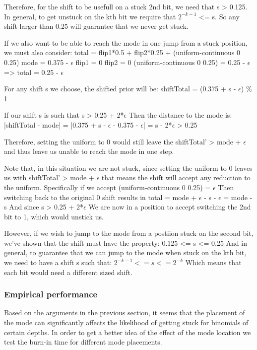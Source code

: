 Therefore, for the shift to be usefull on a stuck 2nd bit, we need that s > 0.125. In general, to get unstuck on the kth bit we require that $2^{-k-1}$ <= s. So any shift larger than 0.25 will guarantee that we never get stuck.

If we also want to be able to reach the mode in one jump from a stuck position, we must also consider:
total = flip1*0.5 + flip2*0.25 + (uniform-continuous 0 0.25)
mode = 0.375 - $\epsilon$
flip1 = 0
flip2 = 0
(uniform-continuous 0 0.25) = 0.25 - $\epsilon$ 
=> total = 0.25 - $\epsilon$

For any shift s we choose, the shifted prior will be:
shiftTotal = (0.375 + s - $\epsilon$) \% 1 

If our shift s is such that
s > 0.25 + 2*$\epsilon$
Then the distance to the mode is:
|shiftTotal - mode| = |0.375 + s - $\epsilon$ - 0.375 - $\epsilon$| = s - 2*$\epsilon$ > 0.25

Therefore, setting the uniform to 0 would still leave the shiftTotal' > mode + $\epsilon$  and thus leave us unable to reach the mode in one step.

Note that, in this situation we are not stuck, since setting the uniform to 0 leaves us with shiftTotal' > mode + $\epsilon$ that means the shift will accept any reduction to the uniform. Specifically if we accept (uniform-continuous 0 0.25) = $\epsilon$ Then switching back to the original 0 shift results in total = mode + $\epsilon$ - s - $\epsilon$ = mode - s And since s > 0.25 + 2*$\epsilon$ We are now in a position to accept switching the 2nd bit to 1, which would unstick us.

However, if we wish to jump to the mode from a postiion stuck on the second bit, we've shown that the shift must have the property:
0.125 <= s <= 0.25
And in general, to guarantee that we can jump to the mode when stuck on the kth bit, we need to have a shift s such that:
$2^{-k-1} <= s <= 2^{-k}$ Which means that each bit would need a different sized shift. 

\subsubsection{Empirical performance}

Based on the arguments in the previous section, it seems that the placement of the mode can significantly affects the likelihood of getting stuck for binomials of certain depths. In order to get a better idea of the effect of the mode location we test the burn-in time for different mode placements. 

